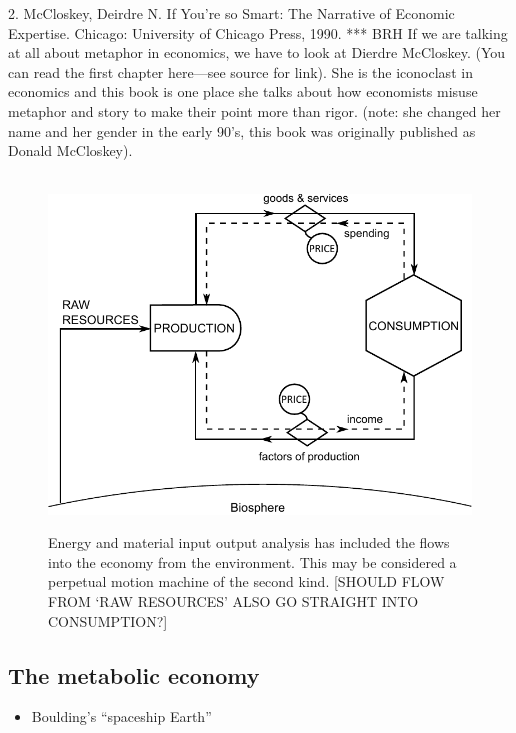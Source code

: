 2. McCloskey, Deirdre N. If You’re so Smart: The Narrative of Economic Expertise. Chicago: University of Chicago Press, 1990. *** BRH 
If we are talking at all about metaphor in economics, we have to look at Dierdre McCloskey. (You can read the first chapter here---see source for link).
She is 
the iconoclast in economics and this book is one place she talks about how economists misuse
metaphor and story to make their point more than rigor. (note: she changed her
name and her gender in the early 90's, this book was originally published as Donald McCloskey).


\begin{figure}[!ht]
\centering\
\includegraphics[width=\linewidth]{Part_0/Chapter_Introduction/images/Perpetual_motion_2.pdf}
\caption[The traditional model supplemented with resource inputs]{Energy 
and material input output analysis has included the flows into the economy from the environment.
This may be considered a perpetual motion machine 
of the second kind.
[SHOULD FLOW FROM `RAW RESOURCES' ALSO GO STRAIGHT INTO CONSUMPTION?]}
\label{fig:perp_motion_2}
\end{figure}

\subsection{The metabolic economy}
\label{sec:metabolic}

\begin{itemize}
	\item{Boulding's ``spaceship Earth''}
\end{itemize}

